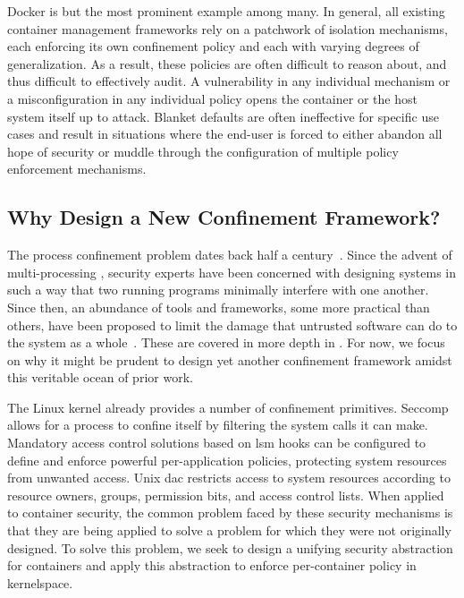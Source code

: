 Docker is but the most prominent example among many. In general, all existing container
management frameworks rely on a patchwork of isolation mechanisms, each enforcing its own
confinement policy and each with varying degrees of generalization. As a result, these
policies are often difficult to reason about, and thus difficult to effectively audit.
A vulnerability in any individual mechanism or a misconfiguration in any individual policy
opens the container or the host system itself up to attack. Blanket defaults are often
ineffective for specific use cases and result in situations where the end-user is forced to
either abandon all hope of security or muddle through the configuration of multiple policy
enforcement mechanisms.

\subsection{Why Design a New Confinement Framework?}%
\label{ss:why-new}

The process confinement problem dates back half a century~\cite{lampson1973_confinement}.
Since the advent of multi-processing ,
security experts have been concerned with designing systems in such a way that two running
programs minimally interfere with one another. Since then, an abundance of tools and
frameworks, some more practical than others, have been proposed to limit the damage that
untrusted software can do to the system as a whole~\cite{shu2016_security_isolation_study}.
These are covered in more depth in . For now, we focus on why it might be
prudent to design yet another confinement framework amidst this veritable ocean of prior work.

The Linux kernel already provides a number of confinement primitives. Seccomp allows for
a process to confine itself by filtering the system calls it can make. Mandatory access
control solutions based on \gls{lsm} hooks can be configured to define
and enforce powerful per-application policies, protecting system resources from unwanted
access. Unix \gls{dac} restricts access to system resources according to resource owners,
groups, permission bits, and access control lists. When applied to container security, the
common problem faced by these security mechanisms is that they are being applied to solve
a problem for which they were not originally designed. To solve this problem, we seek to
design a unifying security abstraction for containers and apply this abstraction to
enforce per-container policy in kernelspace.

